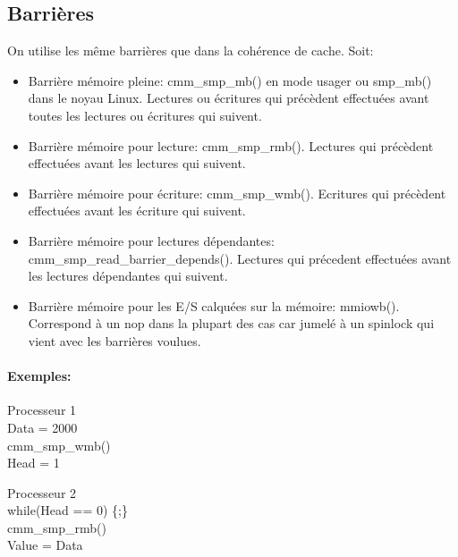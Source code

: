 \documentclass[oneside]{book}
\begin{document}
\subsection{Barrières}
On utilise les même barrières que dans la cohérence de cache. Soit:
\begin{itemize}
\item Barrière mémoire pleine: cmm\_smp\_mb() en mode usager ou smp\_mb() dans le
noyau Linux. Lectures ou écritures qui précèdent effectuées avant toutes les lectures
ou écritures qui suivent.

\item Barrière mémoire pour lecture: cmm\_smp\_rmb(). Lectures qui précèdent effectuées
avant les lectures qui suivent.

\item Barrière mémoire pour écriture: cmm\_smp\_wmb(). Ecritures qui précèdent
effectuées avant les écriture qui suivent.

\item Barrière mémoire pour lectures dépendantes: cmm\_smp\_read\_barrier\_depends().
Lectures qui précedent effectuées avant les lectures dépendantes qui suivent.

\item Barrière mémoire pour les E/S calquées sur la mémoire: mmiowb(). Correspond à un
nop dans la plupart des cas car jumelé à un spinlock qui vient avec les barrières
voulues.
\end{itemize}

\paragraph{Exemples:}

\begin{multicols}{2}
Processeur 1\\

Data = 2000\\
cmm\_smp\_wmb()\\
Head = 1\\

\columnbreak

Processeur 2\\

while(Head == 0) \{;\}\\
cmm\_smp\_rmb()\\
Value = Data\\
\end{multicols}
\end{document}

